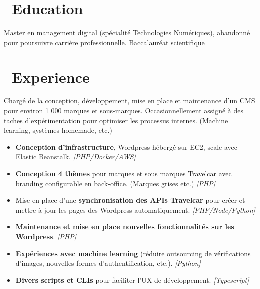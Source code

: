 \documentclass{resume}
\begin{document}



\section{\faGraduationCap\ Education}
Master en management digital (spécialité Technologies Numériques), abandonné pour poursuivre carrière professionnelle.
Baccalauréat scientifique

\section{\faUsers\ Experience}
\role{Concepteur Développeur}

Chargé de la conception, développement, mise en place et maintenance d'un CMS pour environ 1 000 marques et sous-marques.
Occasionnellement assigné à des taches d'expérimentation pour optimiser les processus internes. (Machine learning, systèmes homemade, etc.)
\begin{itemize}
  \item \textbf{Conception d'infrastructure}, Wordpress hébergé sur EC2, scale avec Elastic Beanstalk. \textit{[PHP/Docker/AWS]}
  \item \textbf{Conception 4 thèmes} pour marques et sous marques Travelcar avec branding configurable en back-office. (Marques grises etc.) \textit{[PHP]}
  \item Mise en place d'une \textbf{synchronisation des APIs Travelcar} pour créer et mettre à jour les pages des Wordpress automatiquement. \textit{[PHP/Node/Python]}
  \item \textbf{Maintenance et mise en place nouvelles fonctionnalités sur les Wordpress}. \textit{[PHP]}
  \item \textbf{Expériences avec machine learning} (réduire outsourcing de vérifications d'images, nouvelles formes \newline d'authentification, etc.). \textit{[Python]}
  \item \textbf{Divers scripts et CLIs} pour faciliter l'UX de développement. \textit{[Typescript]}
\end{itemize}
\end{document}
